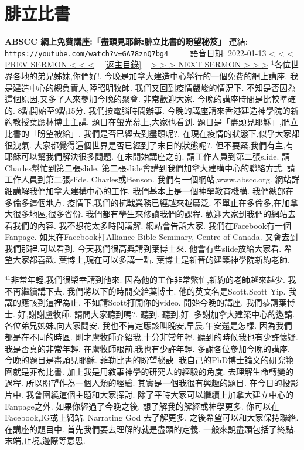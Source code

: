 \documentclass{book}
\begin{document}
\section{腓立比書}
\label{sec:GA78znQ7bg4}
\textbf{ABSCC 網上免費講座:「盡頭見耶穌:腓立比書的盼望秘笈」}
\newline
\newline
連結: \href{https://youtube.com/watch?v=GA78znQ7bg4}{\texttt{https://youtube.com/watch?v=GA78znQ7bg4}} ~~~~ 語音日期: 2022-01-13
\newline
\newline
\hyperref[sec:5]{\small{< < < PREV SERMON < < <}}
~
\hyperref[sec:index]{\small{[返主目錄]}}
~
\hyperref[sec:L8_DVqUvOSM]{\small{> > > NEXT SERMON > > >}}
\newline
\newline
$^{1}$各位世界各地的弟兄姊妹,你們好!.
今晚是加拿大建造中心舉行的一個免費的網上講座.
我是建造中心的總負責人,陸昭明牧師.
我們又回到疫情嚴峻的情況下.
不知是否因為這個原因,又多了人來參加今晚的聚會.
非常歡迎大家.
今晚的講座時間是比較準確的.
8點開始至9點15分.
我們按電腦時間辦事.
今晚的講座請來香港建造神學院的新約教授葉應林博士主講.
題目在螢光幕上,大家也看到.
題目是「盡頭見耶穌」,肥立比書的「盼望被給」.
我們是否已經去到盡頭呢?.
在現在疫情的狀態下,似乎大家都很洩氣.
大家都覺得這個世界是否已經到了末日的狀態呢?.
但不要緊,我們有主,有耶穌可以幫我們解決很多問題.
在未開始講座之前.
請工作人員到第二張slide.
請Charles幫忙到第二張slide.
第二張slide會講到我們加拿大建構中心的聯絡方式.
請工作人員到第二張slide.
Charles或Benson.
我們有一個網站,www.abscc.org.
網站詳細講解我們加拿大建構中心的工作.
我們基本上是一個神學教育機構.
我們總部在多倫多這個地方.
疫情下,我們的抗戰業務已經越來越廣泛.
不單止在多倫多,在加拿大很多地區,很多省份.
我們都有學生來修讀我們的課程.
歡迎大家到我們的網站去看我們的內容.
我不想花太多時間講解.
網站會告訴大家.
我們在Facebook有一個Fanpage.
如果在Facebook打Alliance Bible Seminary, Centre of Canada.
又會去到我們那裡,可以看到.
今天我們很高興請到葉博士來.
他會有些slide放給大家看.
希望大家都喜歡.
葉博士,現在可以多講一點.
葉博士是新晉的建築神學院新約老師.

$^{41}$非常年輕,我們很榮幸請到他來.
因為他的工作非常繁忙,新約的老師越來越少.
我不再繼續講下去.
我們將以下的時間交給葉博士.
他的英文名是Scott,Scott Yip.
我講的應該到這裡為止.
不如請Scott打開你的video.
開始今晚的講座.
我們恭請葉博士.
好,謝謝盧牧師.
請問大家聽到嗎?.
聽到.
聽到,好.
多謝加拿大建築中心的邀請.
各位弟兄姊妹,向大家問安.
我也不肯定應該叫晚安,早晨,午安還是怎樣.
因為我們都是在不同的時區.
剛才盧牧師介紹我,十分非常年輕.
聽到的時候我也有少許懷疑.
我是否真的非常年輕.
在盧牧師眼前,我也有少許年輕.
多謝各位參加今晚的講座.
今晚的題目是盡頭見耶穌.
菲勒比書的盼望秘訣.
我自己的PhD博士論文的研究範圍就是菲勒比書.
加上我是用敘事神學的研究人的經驗的角度.
去理解生命轉變的過程.
所以盼望作為一個人類的經驗.
其實是一個我很有興趣的題目.
在今日的投影片中.
我會圍繞這個主題和大家探討.
除了平時大家可以繼續上加拿大建立中心的Fanpage之外.
如果你經過了今晚之後.
想了解我的解經或神學更多.
你可以在Facebook,IG或上網站.
Narrating God 去了解更多.
之後希望可以和大家保持聯絡.
在講座的題目中.
首先我們要去理解的就是盡頭的定義.
一般來說盡頭包括了終點,末端,止境,邊際等意思.
\end{document}
